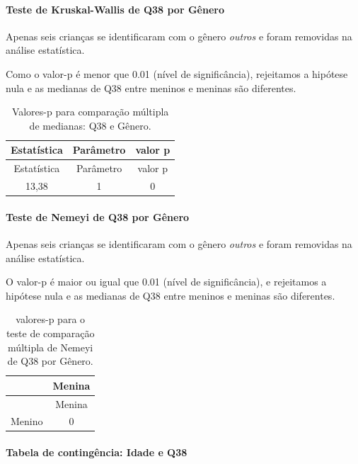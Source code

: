 \documentclass[]{article}
\let\oldparagraph\paragraph
\renewcommand{\paragraph}[1]{\oldparagraph{#1}\mbox{}}
\begin{document}
\hypertarget{teste-de-kruskal-wallis-de-q38-por-guxeanero}{%
\paragraph{Teste de Kruskal-Wallis de Q38 por Gênero}\label{teste-de-kruskal-wallis-de-q38-por-guxeanero}}

Apenas seis crianças se identificaram com o gênero \emph{outros} e foram removidas na análise estatística.

Como o valor-p é menor que 0.01 (nível de significância), rejeitamos a hipótese nula e as medianas de Q38 entre meninos e meninas são diferentes.

\begin{longtable}[]{@{}ccc@{}}
\caption{\label{tab:unnamed-chunk-1446}Valores-p para comparação múltipla de medianas: Q38 e Gênero.}\tabularnewline
\toprule
Estatística & Parâmetro & valor p\tabularnewline
\midrule
\endfirsthead
\toprule
Estatística & Parâmetro & valor p\tabularnewline
\midrule
\endhead
13,38 & 1 & 0\tabularnewline
\bottomrule
\end{longtable}

\hypertarget{teste-de-nemeyi-de-q38-por-guxeanero}{%
\paragraph{Teste de Nemeyi de Q38 por Gênero}\label{teste-de-nemeyi-de-q38-por-guxeanero}}

Apenas seis crianças se identificaram com o gênero \emph{outros} e foram removidas na análise estatística.

O valor-p é maior ou igual que 0.01 (nível de significância), e rejeitamos a hipótese nula e as medianas de Q38 entre meninos e meninas são diferentes.

\begin{longtable}[]{@{}lc@{}}
\caption{\label{tab:unnamed-chunk-1448}valores-p para o teste de comparação múltipla de Nemeyi de Q38 por Gênero.}\tabularnewline
\toprule
& Menina\tabularnewline
\midrule
\endfirsthead
\toprule
& Menina\tabularnewline
\midrule
\endhead
Menino & 0\tabularnewline
\bottomrule
\end{longtable}

\cleardoublepage

\hypertarget{tabela-de-continguxeancia-idade-e-q38}{%
\paragraph{Tabela de contingência: Idade e Q38}\label{tabela-de-continguxeancia-idade-e-q38}}
\end{document}
